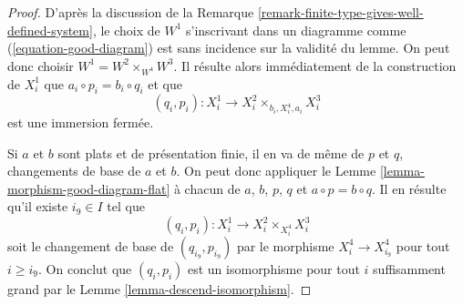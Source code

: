 \begin{proof}
D'apr\`es la discussion de la
Remarque \ref{remark-finite-type-gives-well-defined-system},
le choix de $W^1$ s'inscrivant dans un diagramme comme
(\ref{equation-good-diagram}) est sans incidence sur la validit\'e du
lemme. On peut donc choisir $W^1 = W^2 \times_{W^4} W^3$.
Il r\'esulte alors imm\'ediatement de la construction de $X^1_i$ que 
$a_i \circ p_i = b_i \circ q_i$ et que
$$
(q_i, p_i) : X^1_i \longrightarrow X^2_i \times_{b_i, X^4_i, a_i} X^3_i
$$
est une immersion ferm\'ee.

\medskip\noindent
Si $a$ et $b$ sont plats et de pr\'esentation finie, il en va de m\^eme de
$p$ et $q$, changements de base de $a$ et $b$. On peut donc appliquer le
Lemme \ref{lemma-morphism-good-diagram-flat}
\`a chacun de $a$, $b$, $p$, $q$ et $a \circ p = b \circ q$.
Il en r\'esulte qu'il existe $i_9 \in I$ tel que
$$
(q_i, p_i) : X^1_i \to X^2_i \times_{X^4_i} X^3_i
$$
soit le changement de base de $(q_{i_9}, p_{i_9})$ par le morphisme
$X^4_i \to X^4_{i_9}$ pour tout $i \geq i_9$.
On conclut que $(q_i, p_i)$ est un isomorphisme pour tout $i$ suffisamment
grand par le Lemme \ref{lemma-descend-isomorphism}.
\end{proof}


















 

